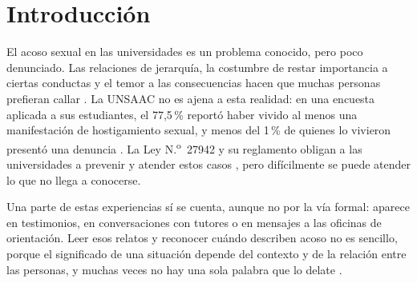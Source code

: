 \chapter*{Introducción}

El acoso sexual en las universidades es un problema conocido, pero poco denunciado. Las relaciones de jerarquía, la costumbre de restar importancia a ciertas conductas y el temor a las consecuencias hacen que muchas personas prefieran callar \citep{bondestam2020, rios2026}. La UNSAAC no es ajena a esta realidad: en una encuesta aplicada a sus estudiantes, el 77,5\,\% reportó haber vivido al menos una manifestación de hostigamiento sexual, y menos del 1\,\% de quienes lo vivieron presentó una denuncia \citep{gutierrez2022}. La Ley N.\textsuperscript{o}~27942 y su reglamento obligan a las universidades a prevenir y atender estos casos \citep{ley27942, ds0142019}, pero difícilmente se puede atender lo que no llega a conocerse.

Una parte de estas experiencias sí se cuenta, aunque no por la vía formal: aparece en testimonios, en conversaciones con tutores o en mensajes a las oficinas de orientación. Leer esos relatos y reconocer cuándo describen acoso no es sencillo, porque el significado de una situación depende del contexto y de la relación entre las personas, y muchas veces no hay una sola palabra que lo delate \citep{salawu2020, dutta2025}.

